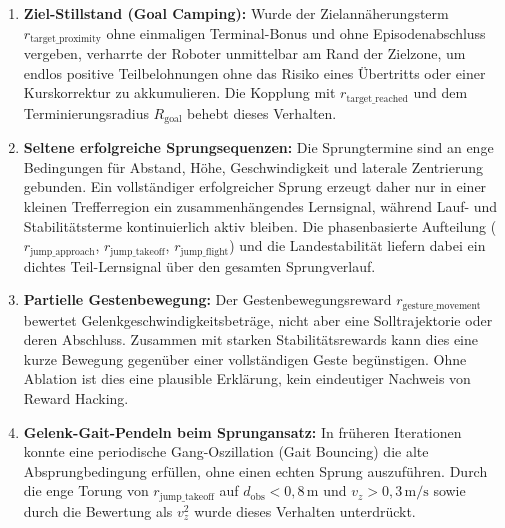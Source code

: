 \begin{enumerate}
	\item \textbf{Ziel-Stillstand (Goal Camping):} Wurde der Zielannäherungsterm $r_{\text{target\_proximity}}$ ohne einmaligen Terminal-Bonus und ohne Episodenabschluss vergeben, verharrte der Roboter unmittelbar am Rand der Zielzone, um endlos positive Teilbelohnungen ohne das Risiko eines Übertritts oder einer Kurskorrektur zu akkumulieren. Die Kopplung mit $r_{\text{target\_reached}}$ und dem Terminierungsradius $R_{\text{goal}}$ behebt dieses Verhalten.
	\item \textbf{Seltene erfolgreiche Sprungsequenzen:} Die Sprungtermine sind an enge Bedingungen für Abstand, Höhe, Geschwindigkeit und laterale Zentrierung gebunden. Ein vollständiger erfolgreicher Sprung erzeugt daher nur in einer kleinen Trefferregion ein zusammenhängendes Lernsignal, während Lauf- und Stabilitätsterme kontinuierlich aktiv bleiben. Die phasenbasierte Aufteilung ($r_{\text{jump\_approach}}$, $r_{\text{jump\_takeoff}}$, $r_{\text{jump\_flight}}$) und die Landestabilität liefern dabei ein dichtes Teil-Lernsignal über den gesamten Sprungverlauf.
	\item \textbf{Partielle Gestenbewegung:} Der Gestenbewegungsreward $r_{\text{gesture\_movement}}$ bewertet Gelenkgeschwindigkeitsbeträge, nicht aber eine Solltrajektorie oder deren Abschluss. Zusammen mit starken Stabilitätsrewards kann dies eine kurze Bewegung gegenüber einer vollständigen Geste begünstigen. Ohne Ablation ist dies eine plausible Erklärung, kein eindeutiger Nachweis von Reward Hacking.
	\item \textbf{Gelenk-Gait-Pendeln beim Sprungansatz:} In früheren Iterationen konnte eine periodische Gang-Oszillation (Gait Bouncing) die alte Absprungbedingung erfüllen, ohne einen echten Sprung auszuführen. Durch die enge Torung von $r_{\text{jump\_takeoff}}$ auf $d_{\text{obs}}<0{,}8\,\text{m}$ und $v_z>0{,}3\,\text{m/s}$ sowie durch die Bewertung als $v_z^2$ wurde dieses Verhalten unterdrückt.
\end{enumerate}
